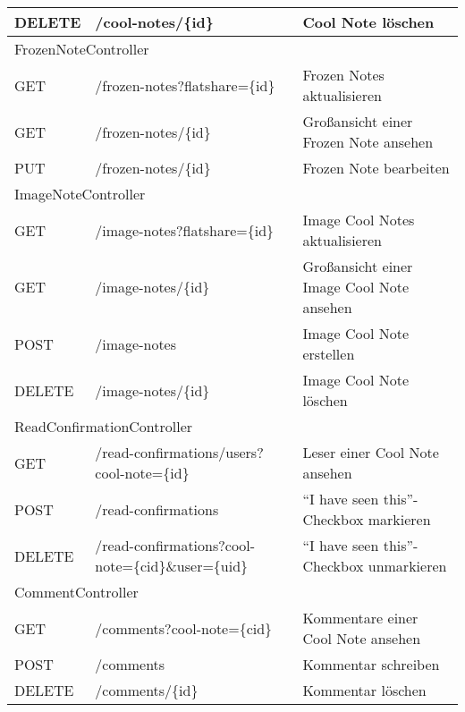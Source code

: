 \begin{flushleft}
\begin{longtable}{|p{}|p{}|p{}|}
		DELETE & /cool-notes/\{id\} & Cool Note löschen \\
		\hline
		\multicolumn{3}{|l|}{FrozenNoteController} \\
		\hline
		GET & /frozen-notes?flatshare=\{id\} & Frozen Notes aktualisieren \\
		GET & /frozen-notes/\{id\} & Großansicht einer Frozen Note ansehen \\
		PUT & /frozen-notes/\{id\} & Frozen Note bearbeiten \\
		\hline
		\multicolumn{3}{|l|}{ImageNoteController} \\
		\hline
		GET & /image-notes?flatshare=\{id\} & Image Cool Notes aktualisieren \\
		GET & /image-notes/\{id\} & Großansicht einer Image Cool Note ansehen \\
		POST & /image-notes & Image Cool Note erstellen \\
		DELETE & /image-notes/\{id\} & Image Cool Note löschen \\
		\hline	
		\multicolumn{3}{|l|}{ReadConfirmationController} \\
		\hline
		GET & /read-confirmations/users?cool-note=\{id\} & Leser einer Cool Note ansehen \\
		POST & /read-confirmations & ``I have seen this''-Checkbox markieren \\
		DELETE & /read-confirmations?cool-note=\{cid\}\&user=\{uid\} & ``I have seen this''-Checkbox unmarkieren \\
		\hline
		\multicolumn{3}{|l|}{CommentController} \\
		\hline
		GET & /comments?cool-note=\{cid\} & Kommentare einer Cool Note ansehen \\
		POST & /comments & Kommentar schreiben \\
		DELETE & /comments/\{id\} & Kommentar löschen \\
		\hline
		\end{longtable}
	\end{flushleft}
	

